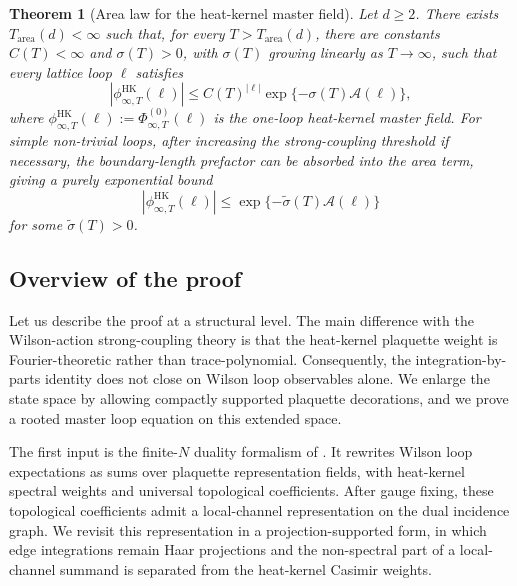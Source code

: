 \documentclass[11pt,a4paper,reqno]{amsart}
\newtheorem{theorem}{Theorem}[section]
\theoremstyle{definition}
\theoremstyle{remark}
\newcommand\HK{{\mathrm{HK}}}
\begin{document}
\begin{theorem}[Area law for the heat-kernel master field]\label{thm:main-area-law}
Let $d\ge2$. There exists $T_{\mathrm{area}}(d)<\infty$ such that, for every $T>T_{\mathrm{area}}(d)$, there are constants $C(T)<\infty$ and $\sigma(T)>0$, with $\sigma(T)$ growing linearly as $T\to\infty$, such that every lattice loop $\ell$ satisfies
\begin{equation}\label{eq:mf-area-law1}
\left|\phi^{\HK}_{\infty,T}(\ell)\right|\le C(T)^{|\ell|}\exp\{-\sigma(T)\mathcal A(\ell)\},
\end{equation}
where $\phi^{\HK}_{\infty,T}(\ell):=\Phi^{(0)}_{\infty,T}(\ell)$ is the one-loop heat-kernel master field. For simple non-trivial loops, after increasing the strong-coupling threshold if necessary, the boundary-length prefactor can be absorbed into the area term, giving a purely exponential bound
\begin{equation}\label{eq:mf-area-law2}
\left|\phi^{\HK}_{\infty,T}(\ell)\right|\le \exp\{-\widetilde\sigma(T)\mathcal A(\ell)\}
\end{equation}
for some $\widetilde\sigma(T)>0$.
\end{theorem}

\subsection{Overview of the proof}
\label{subsec:beyond-wilson}

Let us describe the proof at a structural level. The main difference with the Wilson-action strong-coupling theory is that the heat-kernel plaquette weight is Fourier-theoretic rather than trace-polynomial. Consequently, the integration-by-parts identity does not close on Wilson loop observables alone. We enlarge the state space by allowing compactly supported plaquette decorations, and we prove a rooted master loop equation on this extended space.

The first input is the finite-$N$ duality formalism of \cite{Lem26a}. It rewrites Wilson loop expectations as sums over plaquette representation fields, with heat-kernel spectral weights and universal topological coefficients. After gauge fixing, these topological coefficients admit a local-channel representation on the dual incidence graph. We revisit this representation in a projection-supported form, in which edge integrations remain Haar projections and the non-spectral part of a local-channel summand is separated from the heat-kernel Casimir weights.
\end{document}
